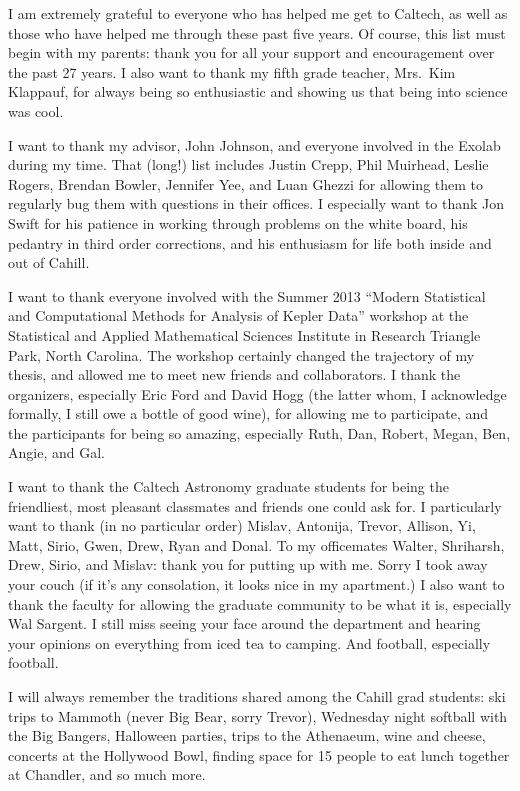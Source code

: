 \documentclass[12pt]{caltech_thesis}
\begin{document}
\begin{acknowledgements} 	 
I am extremely grateful to everyone who has helped me get to Caltech, as well as those
who have helped me through these past five years.
Of course, this list must begin with my parents: thank you for all your support and
encouragement over the past 27 years.
I also want to thank my fifth grade teacher, Mrs.\ Kim Klappauf, for always being so
enthusiastic and showing us that being into science was cool.

I want to thank my advisor, John Johnson, and everyone involved in the Exolab during 
my time. 
That (long!) list includes Justin Crepp, Phil Muirhead, Leslie Rogers,
Brendan Bowler, Jennifer Yee, and Luan Ghezzi for allowing them to regularly bug them with
questions in their offices.
I especially want to thank Jon Swift for his patience in working through problems on the
white board, his pedantry in third order corrections, and his enthusiasm for life both
inside and out of Cahill.

I want to thank everyone involved with the Summer 2013 ``Modern Statistical and
Computational Methods for Analysis of Kepler Data'' workshop at the Statistical and
Applied Mathematical Sciences Institute in Research Triangle Park, North Carolina.
The workshop certainly changed the trajectory of my thesis, and allowed me to meet 
new friends and collaborators. 
I thank the organizers, especially Eric Ford and David Hogg (the latter whom, I
acknowledge formally,
I still owe a bottle of good wine), for allowing me to participate, and the participants
for being so amazing, especially Ruth, Dan, Robert, Megan, Ben, Angie, and Gal.

I want to thank the Caltech Astronomy graduate students for being the friendliest, 
most pleasant classmates and friends one could ask for. 
I particularly want to thank (in no particular order) Mislav, Antonija, Trevor, Allison, Yi, Matt, Sirio,
Gwen, Drew, Ryan and Donal. 
To my officemates Walter, Shriharsh, Drew, Sirio, and Mislav: thank you for putting up
with me. Sorry I took away your couch (if it's any consolation, it looks nice in my 
apartment.)
I also want to thank the faculty for allowing the graduate community to be what it is, 
especially Wal Sargent. I still miss seeing your face around the department and hearing
your opinions on everything from iced tea to camping. And football, especially football.

I will always remember the traditions shared among the Cahill grad students: 
ski trips to Mammoth (never Big Bear, sorry Trevor), Wednesday night softball with the Big Bangers,
Halloween parties, trips to the Athenaeum, wine and cheese, concerts at the Hollywood
Bowl, finding space for 15 people to eat lunch together at Chandler, and so much more.


\end{acknowledgements}
\end{document}
